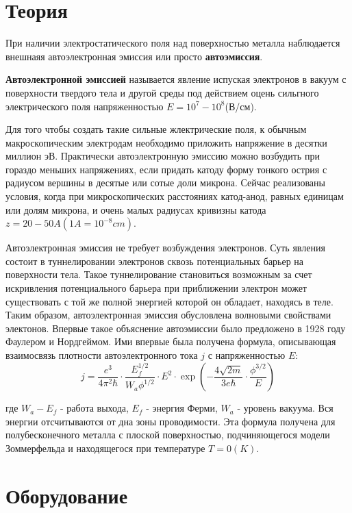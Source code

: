 \documentclass[a4paper]{article}
\begin{document}
\section{Теория}

При наличии электростатического поля над поверхностью металла наблюдается внешнаяя автоэлектронная 
эмиссия или просто \textbf{автоэмиссия}.

\textbf{Автоэлектронной эмиссией} называется явление испуская электронов в вакуум с поверхности
твердого тела и другой среды под действием оцень сильгного электрического поля напряженностью 
$E = 10^7 - 10^8$(В/см).

Для того чтобы создать такие сильные жлектрические поля, к обычным макроскопическим электродам 
необходимо приложить напряжение в десятки миллион эВ. Практически автоэлектронную эмиссию можно 
возбудить при гораздо меньших напряжениях, если придать катоду форму тонкого острия с радиусом
вершины в десятые или сотые доли микрона. Сейчас реализованы условия, когда при микроскопических
расстояниях катод-анод, равных единицам или долям микрона, и очень малых радиусах кривизны катода 
$z = 20 - 50 A (1 A = 10^{-8}cm)$.

Автоэлектронная эмиссия не требует возбуждения электронов. Суть явления состоит в туннелировании
электронов сквозь потенциальных барьер на поверхности тела. Такое туннелирование становиться возможным
за счет искривления потенциального барьера при приближении электрон может существовать с той же 
полной энергией которой он обладает, находясь в теле. Таким образом, автоэлектронная эмиссия обусловлена
волновыми свойствами электонов. Впервые такое объяснение автоэмиссии было предложено в 1928 году 
Фаулером и Нордгеймом. Ими впервые была получена формула, описывающая взаимосвязь плотности 
автоэлектронного тока $j$ с напряженностью $E$:
$$j = \frac{e^3}{4 \pi^2 \hbar} \cdot \frac{E_f^{1/2}}{W_a \phi^{1/2}} \cdot E^2 \cdot \exp{\left( - \frac{4 \sqrt{2m}}{3e\hbar} \cdot \frac{\phi^{3/2}}{E} \right)}$$

где $W_a - E_f$ - работа выхода, $E_f$ - энергия Ферми, $W_a$ - уровень вакуума. Вся энергии отсчитываются
от дна зоны проводимости.
Эта формула получена для полубесконечного металла с плоской поверхностью, подчиняющегося модели 
Зоммерфельда и находящегося при температуре $T = 0 (K)$. 

\section{Оборудование}
\end{document}
